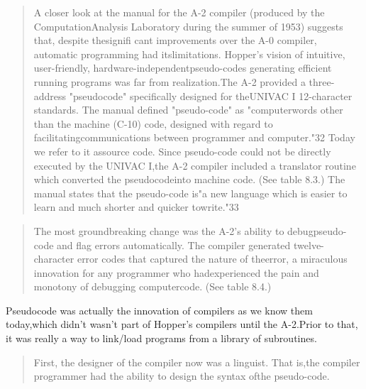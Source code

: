 \begin{quotation}
A closer look at the manual for the A-2 compiler (produced by the ComputationAnalysis Laboratory during the summer of 1953) suggests that, despite thesignifi cant improvements over the A-0 compiler, automatic programming had itslimitations.  Hopper's vision of intuitive, user-friendly, hardware-independentpseudo-codes generating efficient running programs was far from realization.The A-2 provided a three-address "pseudocode" specifically designed for theUNIVAC I 12-character standards. The manual defined "pseudo-code" as "computerwords other than the machine (C-10) code, designed with regard to facilitatingcommunications between programmer and computer."32 Today we refer to it assource code. Since pseudo-code could not be directly executed by the UNIVAC I,the A-2 compiler included a translator routine which converted the pseudocodeinto machine code. (See table 8.3.) The manual states that the pseudo-code is"a new language which is easier to learn and much shorter and quicker towrite."33\end{quotation}
\begin{quotation}
 The most groundbreaking change was the A-2's ability to debugpseudo-code and flag errors automatically. The compiler generated twelve-character error codes that captured the nature of theerror, a miraculous innovation for any programmer who hadexperienced the pain and monotony of debugging computercode. (See table 8.4.)\end{quotation}
Pseudocode was actually the innovation of compilers as we know them today,which didn't wasn't part of Hopper's compilers until the A-2.Prior to that, it was really a way to link/load programs from a library of subroutines.\begin{quotation}
First, the designer of the compiler now was a linguist. That is,the compiler programmer had the ability to design the syntax ofthe pseudo-code.\end{quotation}
